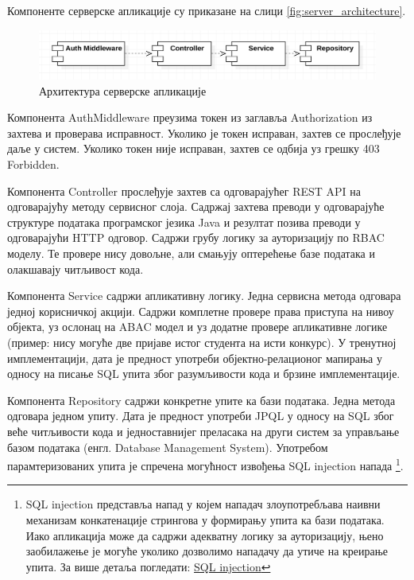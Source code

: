 \documentclass[a4paper]{article}
\begin{document}
Компоненте серверске апликације су приказане на слици \autoref{fig:server_architecture}.

\begin{figure}[H]
    \centering
    \includegraphics{images/server_architecture.png}
    \caption{Архитектура серверске апликације}
    \label{fig:server_architecture}
\end{figure}

Компонента AuthMiddleware преузима токен из заглавља Authorization из захтева и проверава исправност. Уколико је токен 
исправан, захтев се прослеђује даље у систем. Уколико токен није исправан, захтев се одбија уз грешку 403 Forbidden.

Компонента Controller прослеђује захтев са одговарајућег REST API\cite{rest} на одговарајућу методу сервисног слоја. Садржај
захтева преводи у одговарајуће структуре података програмског језика Java и резултат позива преводи у одговарајући HTTP одговор. Садржи грубу логику за ауторизацију по RBAC\cite{rbac} моделу. Те провере нису довољне, али смањују оптерећење базе података и олакшавају читљивост кода.

Компонента Service садржи апликативну логику. Једна сервисна метода одговара једној корисничкој акцији. Садржи комплетне
провере права приступа на нивоу објекта, уз ослонац на ABAC\cite{abac} модел и уз додатне провере апликативне логике
(пример: нису могуће две пријаве истог студента на исти конкурс). У тренутној имплементацији, дата је предност употреби
објектно-релационог мапирања у односу на писање SQL упита због разумљивости кода и брзине имплементације.

Компонента Repository садржи конкретне упите ка бази података. Једна метода одговара једном упиту. Дата је предност
употреби JPQL у односу на SQL због веће читљивости кода и једноставнијег преласака на други систем за управљање базом података (енгл. Database Management System). Употребом парамтеризованих упита је спречена могућност извођења SQL injection напада
\footnote{SQL injection представља напад у којем нападач злоупотребљава наивни механизам конкатенације стрингова у формирању упита ка бази података.
Иако апликација може да садржи адекватну логику за ауторизацију, њено заобилажење је могуће уколико дозволимо нападачу да утиче на креирање упита.
За више детаља погледати: \href{https://portswigger.net/web-security/sql-injection}{SQL injection}}.
\end{document}
